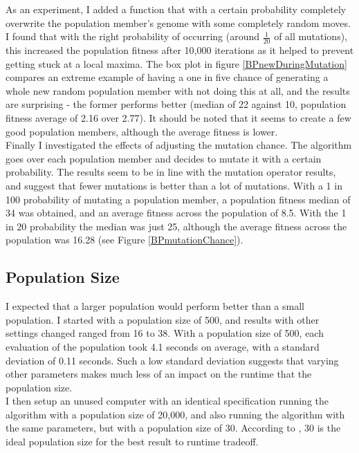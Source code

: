 \documentclass[]{report}
\begin{document}
As an experiment, I added a function that with a certain probability completely overwrite the population member's genome with some completely random moves. I found that with the right probability of occurring (around $\frac{1}{20}$ of all mutations), this increased the population fitness after 10,000 iterations as it helped to prevent getting stuck at a local maxima. The box plot in figure \ref{BPnewDuringMutation} compares an extreme example of having a one in five chance of generating a whole new random population member with not doing this at all, and the results are surprising - the former performs better (median of 22 against 10, population fitness average of 2.16 over 2.77). It should be noted that it seems to create a few good population members, although the average fitness is lower.\\

Finally I investigated the effects of adjusting the mutation chance. The algorithm goes over each population member and decides to mutate it with a certain probability. The results seem to be in line with the mutation operator results, and suggest that fewer mutations is better than a lot of mutations. With a 1 in 100 probability of mutating a population member, a population fitness median of 34 was obtained, and an average fitness across the population of 8.5. With the 1 in 20 probability the median was just 25, although the average fitness across the population was 16.28 (see Figure \ref{BPmutationChance}).

\subsection{Population Size}
I expected that a larger population would perform better than a small population. I started with a population size of 500, and results with other settings changed ranged from 16 to 38. With a population size of 500, each evaluation of the population took 4.1 seconds on average, with a standard deviation of 0.11 seconds. Such a low standard deviation suggests that varying other parameters makes much less of an impact on the runtime that the population size.\\

I then setup an unused computer with an identical specification running the algorithm with a population size of 20,000, and also running the algorithm with the same parameters, but with a population size of 30. According to \cite{MitchelGA}, 30 is the ideal population size for the best result to runtime tradeoff. \\
\end{document}
